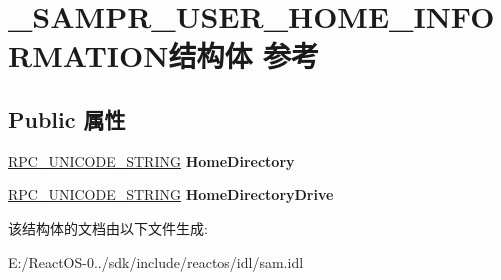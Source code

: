 \hypertarget{struct___s_a_m_p_r___u_s_e_r___h_o_m_e___i_n_f_o_r_m_a_t_i_o_n}{}\section{\+\_\+\+S\+A\+M\+P\+R\+\_\+\+U\+S\+E\+R\+\_\+\+H\+O\+M\+E\+\_\+\+I\+N\+F\+O\+R\+M\+A\+T\+I\+O\+N结构体 参考}
\label{struct___s_a_m_p_r___u_s_e_r___h_o_m_e___i_n_f_o_r_m_a_t_i_o_n}
\subsection*{Public 属性}
\begin{DoxyCompactItemize}
\item 
\mbox{\label{struct___s_a_m_p_r___u_s_e_r___h_o_m_e___i_n_f_o_r_m_a_t_i_o_n_a7e1bf7c6aaa2f0b51cd7eb2a875d1cc3}} 
\hyperlink{struct___r_p_c___u_n_i_c_o_d_e___s_t_r_i_n_g}{R\+P\+C\+\_\+\+U\+N\+I\+C\+O\+D\+E\+\_\+\+S\+T\+R\+I\+NG} {\bfseries Home\+Directory}
\item 
\mbox{\label{struct___s_a_m_p_r___u_s_e_r___h_o_m_e___i_n_f_o_r_m_a_t_i_o_n_ac2828efc4f9edd32e1df0a252e70d409}} 
\hyperlink{struct___r_p_c___u_n_i_c_o_d_e___s_t_r_i_n_g}{R\+P\+C\+\_\+\+U\+N\+I\+C\+O\+D\+E\+\_\+\+S\+T\+R\+I\+NG} {\bfseries Home\+Directory\+Drive}
\end{DoxyCompactItemize}


该结构体的文档由以下文件生成\+:\begin{DoxyCompactItemize}
\item 
E\+:/\+React\+O\+S-\/0../sdk/include/reactos/idl/sam.\+idl\end{DoxyCompactItemize}
